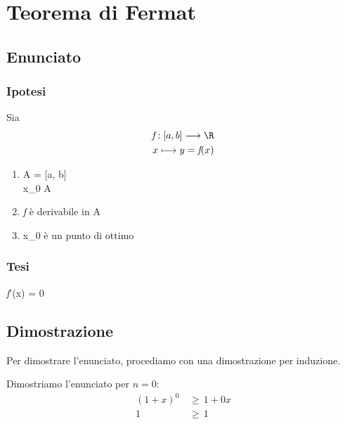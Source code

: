 \documentclass[../dimostrazioni]{subfiles}
\begin{document}
    \chapter{Teorema di Fermat}

        \section*{Enunciato}

        \subsection{Ipotesi}

        Sia \begin{align*} \textit{f} : [a, b] \longrightarrow \R\\
                                           x   \longmapsto     y = \textit{f}(x) 
            \end{align*}
        
        \begin{enumerate}
            \item A = [a, b]\\x_0 \in A
            \item \textit{f} è derivabile in A
            \item x_0 è un punto di ottimo
        \end{enumerate}

        \subsection{Tesi}

        \textit{f}'(x) = 0

        \section*{Dimostrazione}

            Per dimostrare l'enunciato, procediamo con una dimostrazione per induzione.

            \medskip

            Dimostriamo l'enunciato per \(n = 0\):
            \begin{align*}
                (1 + x)^0 \, &\geqslant \, 1 + 0 x\\
                        1 \, &\geqslant \, 1
            \end{align*}
\end{document}
